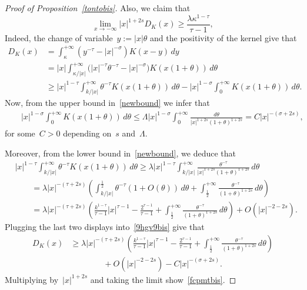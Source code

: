 \documentclass[10pt,a4paper]{amsart}
\numberwithin{equation}{section}
\begin{document}
\begin{proof}[Proof of Proposition~\ref{tontobis}]
Also, we claim that
\begin{equation}\label{fcpmtbis}
\lim_{x \to - \infty} |x |^{1+2s} D_K(x) \geq  \frac{\lambda\kappa^{1-\tau}}{\tau-1},
\end{equation}
Indeed, the change of variable~$y:=|x|\theta$ and the positivity of the kernel give that
\begin{equation}\label{9hgv9bis}
\begin{split}
D_K(x)&= \int_{\kappa}^{+\infty} (y^{-\tau} - |x |^{-\sigma})K(x-y) \, dy \\
&= |x |\int_{{\kappa}/{|x|}}^{+\infty}\big(
|x |^{-\tau} \theta^{-\tau} - |x |^{-\sigma}\big) K(x (1+\theta))\, d\theta\\
&\geq |x |^{1-\tau} \int_{k /|x |}^{+\infty} \theta^{-\tau} K(x(1+\theta)) \, d\theta - |x |^{1-\sigma} \int_{0}^{+\infty} K(x(1+\theta)) \, d\theta.
\end{split}\end{equation}
Now, from the upper bound in~\eqref{newbound} we infer that
\begin{eqnarray*}
&&|x |^{1-\sigma} \int_{0}^{+\infty} K(x(1+\theta)) \, d\theta
\le\Lambda  |x |^{1-\sigma} \int_{0}^{+\infty} \frac{d\theta}{|x|^{1+2s}(1+\theta)^{1+2s}}=C|x|^{-(\sigma+2s)},
\end{eqnarray*} for some~$C>0$ depending on~$s$ and~$\Lambda$.

Moreover, from the lower bound in~\eqref{newbound}, we deduce that
\begin{equation*}
\begin{split}&
|x |^{1-\tau} \int_{k /|x |}^{+\infty} \theta^{-\tau} K(x(1+\theta)) \, d\theta 
\ge \lambda  |x |^{1-\tau} \int_{k /|x |}^{+\infty} \frac{\theta^{-\tau}}{| x|^{1+2s}(1+\theta)^{1+2s}} \, d\theta 
\\&\qquad =\lambda |x |^{-(\tau+2s)} \left( \int_{k /|x |}^{\frac{1}{2}} \theta^{-\tau} \left(1+O(\theta)\right) \, d\theta +\int_{\frac{1}{2}}^{+\infty} \frac{\theta^{-\tau}}{(1+\theta)^{1+2s}} \, d\theta \right) \\
 &\qquad = \lambda |x |^{-(\tau+2s)} \left( \frac{k^{1-\tau}}{\tau-1} | x |^{\tau-1} -\frac{2^{\tau-1}}{\tau-1}+\int_{\frac{1}{2}}^{+\infty} \frac{\theta^{-\tau}}{(1+\theta)^{1+2s}} \, d\theta \right)+  O(|x |^{-2-2s}) .
\end{split}
\end{equation*}
Plugging the last two displays into~\eqref{9hgv9bis} give that
\begin{equation*}
\begin{split}
D_K(x)&\geq \lambda |x |^{-(\tau+2s)} \left( \frac{k^{1-\tau}}{\tau-1} |x |^{\tau-1} -\frac{2^{\tau-1}}{\tau-1}+\int_{\frac{1}{2}}^{+\infty} \frac{\theta^{-\tau}}{(1+\theta)^{1+2s}} \, d\theta \right)\\&\qquad\qquad+  O(|x |^{-2-2s})-C|x|^{-(\sigma+2s)}.
\end{split}\end{equation*}
Multiplying by~$|x|^{1+2s}$ and taking the limit show~\eqref{fcpmtbis}.


\end{proof}
\end{document}
